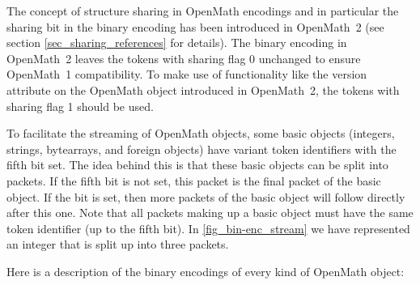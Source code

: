 \documentclass{report}
\def\OM{OpenMath\xspace}
\begin{document}
The concept of structure sharing in \OM encodings and in particular the sharing bit in the
binary encoding has been introduced in \OM~2 (see section \ref{sec_sharing_references} for
details). The binary encoding in \OM~2 leaves the tokens with sharing flag 0 unchanged to
ensure \OM~1 compatibility. To make use of functionality like the version attribute on the
\OM object introduced in \OM~2, the tokens with sharing flag 1 should be used.


To facilitate the streaming of \OM objects, some basic objects (integers, strings,
bytearrays, and foreign objects) have variant token identifiers with the fifth bit
set. The idea behind this is that these basic objects can be split into packets. If the
fifth bit is not set, this packet is the final packet of the basic object. If the bit is
set, then more packets of the basic object will follow directly after this one. Note that
all packets making up a basic object must have the same token identifier (up to the fifth
bit). In \ref{fig_bin-enc_stream} we have represented an integer that is split up into
three packets.

Here is a description of the binary encodings of every kind of \OM object:
\end{document}
